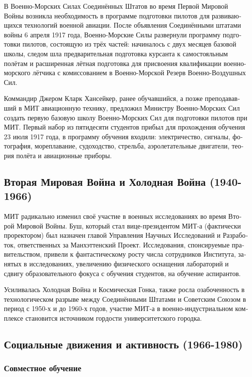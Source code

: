 \begin{russian}
В Военно-Морских Силах Соединённых Штатов во время Первой Мировой Войны возникла необходимость в программе подготовки пилотов для развивающихся технологий военной авиации. После объявления Соединёнными штатами войны 6 апреля 1917 года, Военно-Морские Силы развернули программу подготовки пилотов, состоящую из трёх частей: начиналось с двух месяцев базовой школы, следом шла предварительная подготовка курсанта к самостояльным полётам и расширенная лётная подготовка для присвоения квалификации военно-морского лётчика с комиссованием в Военно-Морской Резерв Военно-Воздушных Сил.

Коммандир Джером Кларк Хансейкер, ранее обучавшийся, а позже преподававший в МИТ авиационную технику, предложил Министру Военно-Морских Сил создать первую базовую школу Военно-Морских Сил для подготовки пилотов при МИТ. Первый набор из пятидесяти студентов прибыл для прохождения обучения 23 июля 1917 года, в программу обучения входили: электричество, сигналы, фотография, мореплавание, судоходство, стрельба, аэролетательные двигатели, теория полёта и авиационные приборы.

\subsection{Вторая Мировая Война и Холодная Война (1940-1966)}

МИТ радикально изменил своё участие в военных исследованиях во время Второй Мировой Войны. Буш, который стал вице-президентом МИТ-а (фактически проректором) был назначен главой Управления Научных Исследований и Разработок, ответственных за Манхэттенский Проект. Исследования, спонсируемые правительством, привели к фантастическому росту числа сотрудников Института, занятых в исследованиях, увеличению физического оснащения лабораторий и сдвигу образовательного фокуса с обучения студентов, на обучение аспирантов.

Усиливалась Холодная Война и Космическая Гонка, также росла озабоченность в технологическом разрыве между Соединёнными Штатами и Советским Союзом в период с 1950-х и до 1960-х годов, участие МИТ-а в военно-индустриальном комплексе становится источником гордости университетского городка.

\subsection {Социальные движения и активность (1966-1980)}

\subsubsection {Совместное обучение}


\end{russian}

